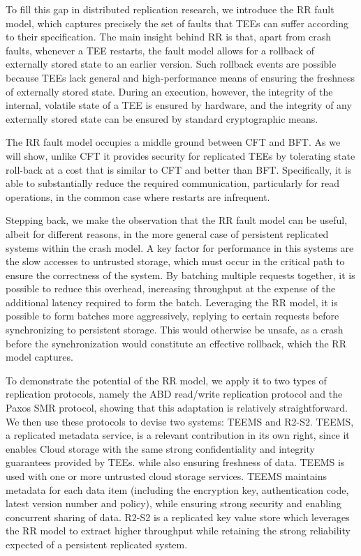 To fill this gap in distributed replication research, we
introduce the \ac{RR} fault model, which
captures precisely the set of faults that \acp{TEE} can suffer according to
their specification.  The main insight behind \ac{RR} is that,
apart from crash faults, whenever a \ac{TEE} restarts, the fault model
allows for a rollback of externally stored state to an earlier
version.  Such rollback events are possible because \acp{TEE} lack general
and high-performance means of ensuring the freshness of externally
stored state.  During an execution, however, the integrity of the
internal, volatile state of a \ac{TEE} is ensured by hardware, and the
integrity of any externally stored state can be ensured by standard
cryptographic means.

The \ac{RR} fault model occupies a middle ground between \ac{CFT}
and \ac{BFT}. As we will show, unlike CFT it provides
security for replicated \acp{TEE} by tolerating state roll-back at a cost
that is similar to \ac{CFT} and better than \ac{BFT}. Specifically, it is able
to substantially reduce the required communication, particularly for
read operations, in the common case where restarts are
infrequent.

Stepping back, we make the observation that the \ac{RR} fault
model can be useful, albeit for different reasons, in the more
general case of persistent replicated systems within the crash
model. A key factor for performance in this systems are the slow
accesses to untrusted storage, which must occur in the critical
path to ensure the correctness of the system. By batching
multiple requests together, it is possible to reduce this
overhead, increasing throughput at the expense of the additional
latency required to form the batch. Leveraging the \ac{RR} model,
it is possible to form batches more aggressively, replying to
certain requests before synchronizing to persistent storage. This
would otherwise be unsafe, as a crash before the synchronization
would constitute an effective rollback, which the \ac{RR} model
captures.

To demonstrate the potential of the \ac{RR} model, we apply it to
two types of replication protocols, namely the \ac{ABD}
 read/write replication protocol and the Paxos \ac{SMR}
protocol, showing that this adaptation is relatively straightforward.
We then use these protocols to devise two systems: \ac{TEEMS} and
\ac{R2-S2}. \ac{TEEMS}, a replicated metadata service,
is a relevant contribution in its own right, since
it enables Cloud storage with the same strong confidentiality and
integrity guarantees provided by \acp{TEE}. while also ensuring freshness
of data. \ac{TEEMS} is used with one or more untrusted cloud storage
services. \ac{TEEMS} maintains metadata for each data item (including the
encryption key, authentication code, latest version number and
policy), while ensuring strong security and enabling concurrent
sharing of data. \ac{R2-S2} is a replicated key value store which
leverages the \ac{RR} model to extract higher throughput while
retaining the strong reliability expected of a persistent
replicated system.

